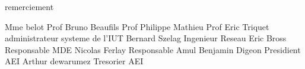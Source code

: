 remerciement 

Mme belot Prof
Bruno Beaufils Prof
Philippe Mathieu Prof
Eric Triquet  administrateur systeme de l'IUT
Bernard Szelag Ingenieur Reseau
Eric Bross Responsable MDE
Nicolas Ferlay Responsable Amul	
Benjamin Digeon Presidient AEI
Arthur dewarumez Tresorier AEI
